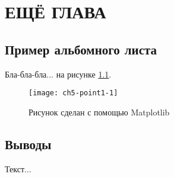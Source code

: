 \chapter{ЕЩЁ ГЛАВА} \label{chapter5}

\section[Пример альбомного листа]{Пример альбомного листа}



Бла-бла-бла... на рисунке \ref{img:point1-1}.



\begin{landscape}

\begin{figure}[hp]
\begin{center}
\texttt{[image: ch5-point1-1]}\\[2mm]
\caption {Рисунок сделан с помощью Matplotlib}\label{img:point1-1}
\end{center}
\end{figure}

\end{landscape}





\section*{Выводы}

Текст...
